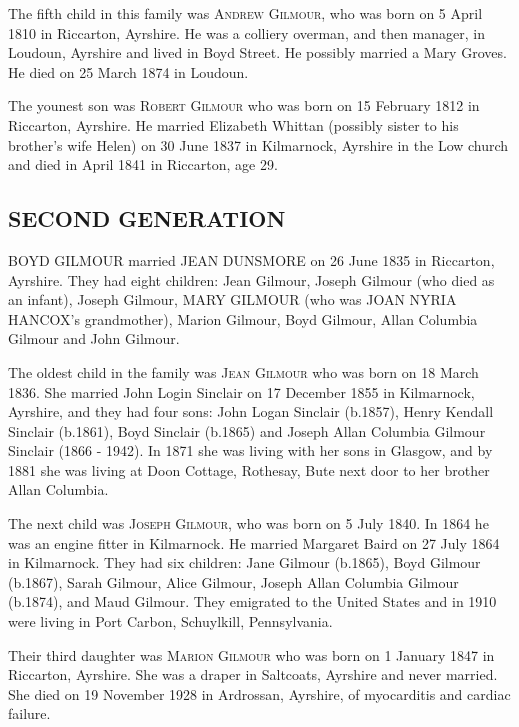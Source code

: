 {The fifth child in this family was \textsc{Andrew Gilmour}, who was born on 5 April 1810 in Riccarton, Ayrshire. He was a colliery overman, and then manager, in Loudoun, Ayrshire and lived in Boyd Street. He possibly married a Mary Groves.  He died 
on 25 March 1874 in Loudoun.

The younest son was \textsc{Robert Gilmour}  who was born on 15 February 1812 in Riccarton, Ayrshire. He married Elizabeth Whittan (possibly sister to his brother's wife Helen) on 30 June 1837 in Kilmarnock, Ayrshire in the Low church and died in April 1841 in Riccarton, age 29.

\subsection{SECOND GENERATION}

\uppercase{Boyd Gilmour} married \uppercase{Jean Dunsmore} on 26 June 1835 in Riccarton, Ayrshire.  They had eight children:  Jean Gilmour, Joseph Gilmour (who died as an infant), Joseph Gilmour, \uppercase{Mary Gilmour} (who was \uppercase{Joan Nyria Hancox}'s grandmother), Marion Gilmour, Boyd Gilmour, Allan Columbia Gilmour and John Gilmour. 

The oldest child in the family was \textsc{Jean Gilmour} who was born on 18 March 1836. She married John Login Sinclair on 17 December 1855 in Kilmarnock, Ayrshire, and they had four sons: John Logan Sinclair (b.1857), Henry Kendall Sinclair (b.1861), 
Boyd Sinclair (b.1865) and Joseph Allan Columbia Gilmour Sinclair (1866 - 1942).  In 1871 she was living with her sons in Glasgow, and by 1881 she was living at Doon Cottage, Rothesay, Bute next door to her brother Allan Columbia.

The next child was \textsc{Joseph Gilmour}, who was born on 5 July 1840. In 1864 he was an engine fitter in Kilmarnock. He married Margaret Baird on 27 July 1864 in Kilmarnock. They had six children: Jane Gilmour (b.1865), Boyd Gilmour (b.1867), Sarah Gilmour, Alice Gilmour, Joseph Allan Columbia Gilmour (b.1874), and Maud Gilmour. They emigrated to the United States and in 1910 were living in Port Carbon, Schuylkill, Pennsylvania.

Their third daughter was \textsc{Marion Gilmour} who was born on 1 January 1847 in Riccarton, Ayrshire. She was a draper in Saltcoats, Ayrshire and never married. She died on 19 November 1928 in Ardrossan, Ayrshire, of myocarditis and cardiac failure.

}
